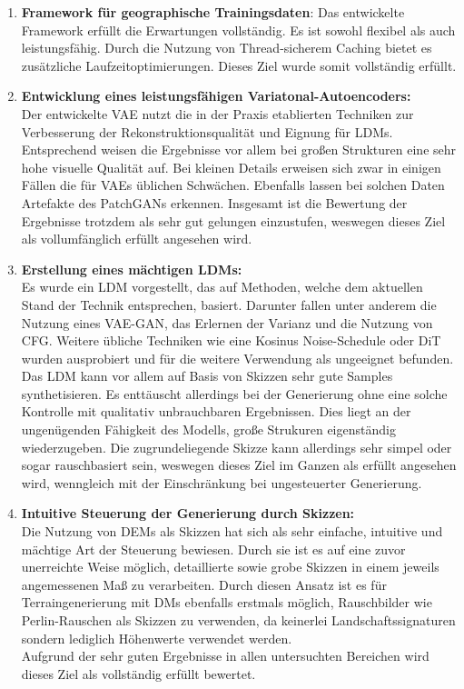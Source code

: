 \begin{enumerate}
    \item \textbf {Framework für geographische Trainingsdaten}:
    Das entwickelte Framework erfüllt die Erwartungen vollständig. Es ist sowohl flexibel als auch leistungsfähig. Durch die Nutzung von Thread-sicherem Caching bietet es zusätzliche Laufzeitoptimierungen. Dieses Ziel wurde somit vollständig erfüllt.

    \item \textbf {Entwicklung eines leistungsfähigen Variatonal-Autoencoders:} \\
    Der entwickelte \ac{VAE} nutzt die in der Praxis etablierten Techniken zur Verbesserung der Rekonstruktionsqualität und Eignung für \ac{LDM}s. Entsprechend weisen die Ergebnisse vor allem bei großen Strukturen eine sehr hohe visuelle Qualität auf. Bei kleinen Details erweisen sich zwar in einigen Fällen die für \ac{VAE}s üblichen Schwächen. Ebenfalls lassen bei solchen Daten Artefakte des PatchGANs erkennen. Insgesamt ist die Bewertung der Ergebnisse trotzdem als sehr gut gelungen einzustufen, weswegen dieses Ziel als vollumfänglich erfüllt angesehen wird. 
    
    \item \textbf {Erstellung eines mächtigen \ac{LDM}s:} \\
    Es wurde ein \ac{LDM} vorgestellt, das auf Methoden, welche dem aktuellen Stand der Technik entsprechen, basiert. Darunter fallen unter anderem die Nutzung eines VAE-GAN, das Erlernen der Varianz und die Nutzung von \ac{CFG}. Weitere übliche Techniken wie eine Kosinus Noise-Schedule oder \ac{DiT} wurden ausprobiert und für die weitere Verwendung als ungeeignet befunden. \\
    Das \ac{LDM} kann vor allem auf Basis von Skizzen sehr gute Samples synthetisieren. Es enttäuscht allerdings bei der Generierung ohne eine solche Kontrolle mit qualitativ unbrauchbaren Ergebnissen. Dies liegt an der ungenügenden Fähigkeit des Modells, große Strukuren eigenständig wiederzugeben. Die zugrundeliegende Skizze kann allerdings sehr simpel oder sogar rauschbasiert sein, weswegen dieses Ziel im Ganzen als erfüllt angesehen wird, wenngleich mit der Einschränkung bei ungesteuerter Generierung.

    \item \textbf {Intuitive Steuerung der Generierung durch Skizzen:} \\
    Die Nutzung von \ac{DEM}s als Skizzen hat sich als sehr einfache, intuitive und mächtige Art der Steuerung bewiesen. Durch sie ist es auf eine zuvor unerreichte Weise möglich, detaillierte sowie grobe Skizzen in einem jeweils angemessenen Maß zu verarbeiten. Durch diesen Ansatz ist es für Terraingenerierung mit \ac{DM}s ebenfalls erstmals möglich, Rauschbilder wie Perlin-Rauschen als Skizzen zu verwenden, da keinerlei Landschaftssignaturen sondern lediglich Höhenwerte verwendet werden. \\
    Aufgrund der sehr guten Ergebnisse in allen untersuchten Bereichen wird dieses Ziel als vollständig erfüllt bewertet. 


\end{enumerate}
